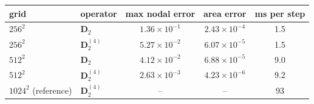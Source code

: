 \begin{tabular}{ll ccc}
\toprule
grid & operator & max nodal error & area error & ms per step\\
\midrule
$256^2$ & $\mathbf D_2$ & $1.36{\times}10^{-1}$ & $2.43{\times}10^{-4}$ & 1.5\\
$256^2$ & $\mathbf D_2^{(4)}$ & $5.27{\times}10^{-2}$ & $6.07{\times}10^{-5}$ & 1.5\\
$512^2$ & $\mathbf D_2$ & $4.12{\times}10^{-2}$ & $6.88{\times}10^{-5}$ & 9.0\\
$512^2$ & $\mathbf D_2^{(4)}$ & $2.63{\times}10^{-3}$ & $4.23{\times}10^{-6}$ & 9.2\\
$1024^2$ (reference) & $\mathbf D_2^{(4)}$ & -- & -- & 93\\
\bottomrule
\end{tabular}

